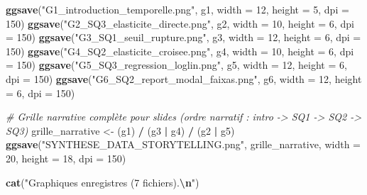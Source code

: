 \documentclass[
]{article}
\newenvironment{Shaded}{\begin{snugshade}}{\end{snugshade}}
\newcommand{\AttributeTok}[1]{\textcolor[rgb]{0.13,0.29,0.53}{#1}}
\newcommand{\CommentTok}[1]{\textcolor[rgb]{0.56,0.35,0.01}{\textit{#1}}}
\newcommand{\DecValTok}[1]{\textcolor[rgb]{0.00,0.00,0.81}{#1}}
\newcommand{\FunctionTok}[1]{\textcolor[rgb]{0.13,0.29,0.53}{\textbf{#1}}}
\newcommand{\NormalTok}[1]{#1}
\newcommand{\OtherTok}[1]{\textcolor[rgb]{0.56,0.35,0.01}{#1}}
\newcommand{\SpecialCharTok}[1]{\textcolor[rgb]{0.81,0.36,0.00}{\textbf{#1}}}
\newcommand{\StringTok}[1]{\textcolor[rgb]{0.31,0.60,0.02}{#1}}
\begin{document}
\begin{Shaded}
\begin{Highlighting}[]
\FunctionTok{ggsave}\NormalTok{(}\StringTok{"G1\_introduction\_temporelle.png"}\NormalTok{,  g1, }\AttributeTok{width =} \DecValTok{12}\NormalTok{, }\AttributeTok{height =} \DecValTok{5}\NormalTok{, }\AttributeTok{dpi =} \DecValTok{150}\NormalTok{)}
\FunctionTok{ggsave}\NormalTok{(}\StringTok{"G2\_SQ3\_elasticite\_directe.png"}\NormalTok{,   g2, }\AttributeTok{width =} \DecValTok{10}\NormalTok{, }\AttributeTok{height =} \DecValTok{6}\NormalTok{, }\AttributeTok{dpi =} \DecValTok{150}\NormalTok{)}
\FunctionTok{ggsave}\NormalTok{(}\StringTok{"G3\_SQ1\_seuil\_rupture.png"}\NormalTok{,        g3, }\AttributeTok{width =} \DecValTok{12}\NormalTok{, }\AttributeTok{height =} \DecValTok{6}\NormalTok{, }\AttributeTok{dpi =} \DecValTok{150}\NormalTok{)}
\FunctionTok{ggsave}\NormalTok{(}\StringTok{"G4\_SQ2\_elasticite\_croisee.png"}\NormalTok{,   g4, }\AttributeTok{width =} \DecValTok{10}\NormalTok{, }\AttributeTok{height =} \DecValTok{6}\NormalTok{, }\AttributeTok{dpi =} \DecValTok{150}\NormalTok{)}
\FunctionTok{ggsave}\NormalTok{(}\StringTok{"G5\_SQ3\_regression\_loglin.png"}\NormalTok{,    g5, }\AttributeTok{width =} \DecValTok{12}\NormalTok{, }\AttributeTok{height =} \DecValTok{6}\NormalTok{, }\AttributeTok{dpi =} \DecValTok{150}\NormalTok{)}
\FunctionTok{ggsave}\NormalTok{(}\StringTok{"G6\_SQ2\_report\_modal\_faixas.png"}\NormalTok{,  g6, }\AttributeTok{width =} \DecValTok{12}\NormalTok{, }\AttributeTok{height =} \DecValTok{6}\NormalTok{, }\AttributeTok{dpi =} \DecValTok{150}\NormalTok{)}
 
\CommentTok{\# Grille narrative complète pour slides (ordre narratif : intro {-}\textgreater{} SQ1 {-}\textgreater{} SQ2 {-}\textgreater{} SQ3)}
\NormalTok{grille\_narrative }\OtherTok{\textless{}{-}}\NormalTok{ (g1) }\SpecialCharTok{/}\NormalTok{ (g3 }\SpecialCharTok{|}\NormalTok{ g4) }\SpecialCharTok{/}\NormalTok{ (g2 }\SpecialCharTok{|}\NormalTok{ g5)}
\FunctionTok{ggsave}\NormalTok{(}\StringTok{"SYNTHESE\_DATA\_STORYTELLING.png"}\NormalTok{, grille\_narrative, }\AttributeTok{width =} \DecValTok{20}\NormalTok{, }\AttributeTok{height =} \DecValTok{18}\NormalTok{, }\AttributeTok{dpi =} \DecValTok{150}\NormalTok{)}
 
\FunctionTok{cat}\NormalTok{(}\StringTok{"Graphiques enregistres (7 fichiers).}\SpecialCharTok{\textbackslash{}n}\StringTok{"}\NormalTok{)}
\end{Highlighting}
\end{Shaded}
\end{document}
